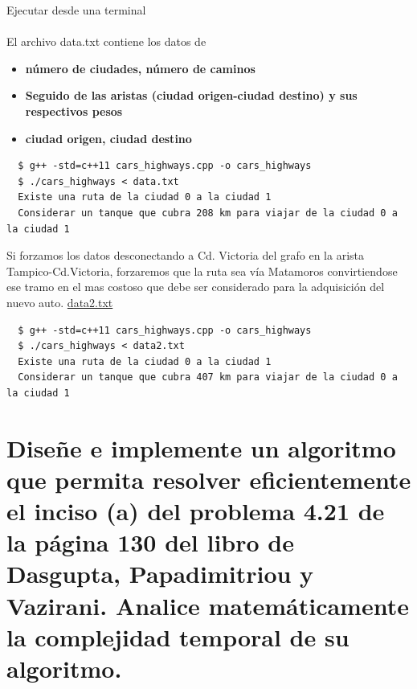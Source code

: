 \documentclass{article}
\begin{document}
Ejecutar desde una terminal\\\\

El archivo data.txt contiene los datos de
\begin{itemize}
\item \textbf{número de ciudades, número de caminos}
\item \textbf{Seguido de las aristas (ciudad origen-ciudad destino) y sus respectivos pesos}
\item \textbf{ciudad origen, ciudad destino}
\end{itemize}

\begin{commandline}
\begin{verbatim}
  $ g++ -std=c++11 cars_highways.cpp -o cars_highways
  $ ./cars_highways < data.txt
  Existe una ruta de la ciudad 0 a la ciudad 1
  Considerar un tanque que cubra 208 km para viajar de la ciudad 0 a la ciudad 1
\end{verbatim}
\end{commandline}

Si forzamos los datos desconectando a Cd. Victoria del grafo en la arista Tampico-Cd.Victoria, forzaremos que la ruta sea vía Matamoros convirtiendose ese tramo en el mas costoso que debe ser considerado para la adquisición del nuevo auto. \href{https://github.com/luisballado/ADA/blob/main/practice_code/tarea5/car_highways/data2.txt}{data2.txt}\\

\begin{commandline}
\begin{verbatim}
  $ g++ -std=c++11 cars_highways.cpp -o cars_highways
  $ ./cars_highways < data2.txt
  Existe una ruta de la ciudad 0 a la ciudad 1
  Considerar un tanque que cubra 407 km para viajar de la ciudad 0 a la ciudad 1
\end{verbatim}
\end{commandline}


\newpage
\section{Diseñe e implemente un algoritmo que permita resolver eficientemente el inciso (a) del problema 4.21 de la página 130 del libro de Dasgupta, Papadimitriou y Vazirani. Analice matemáticamente la complejidad temporal de su algoritmo.}
\end{document}
